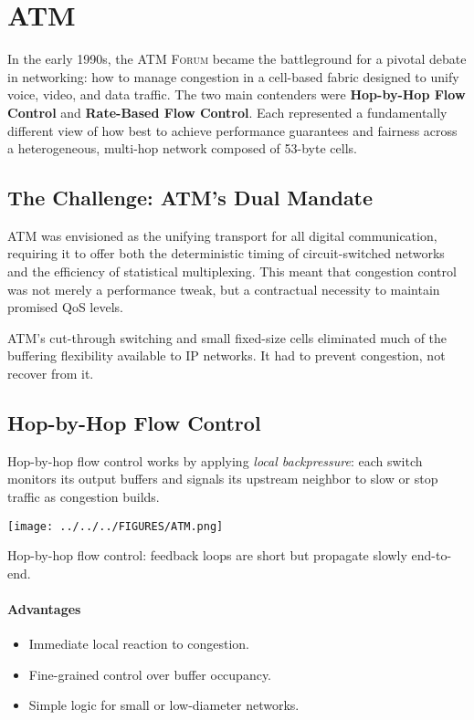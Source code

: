 \section{ATM}

In the early 1990s, the \textsc{ATM Forum} became the battleground for a pivotal debate in networking: how to manage congestion in a cell-based fabric designed to unify voice, video, and data traffic. The two main contenders were \textbf{Hop-by-Hop Flow Control} and \textbf{Rate-Based Flow Control}. Each represented a fundamentally different view of how best to achieve performance guarantees and fairness across a heterogeneous, multi-hop network composed of 53-byte cells.

\subsection{The Challenge: ATM’s Dual Mandate}

ATM was envisioned as the unifying transport for all digital communication, requiring it to offer both the deterministic timing of circuit-switched networks and the efficiency of statistical multiplexing. This meant that congestion control was not merely a performance tweak, but a contractual necessity to maintain promised QoS levels.

ATM’s cut-through switching and small fixed-size cells eliminated much of the buffering flexibility available to IP networks. It had to prevent congestion, not recover from it.

\subsection{Hop-by-Hop Flow Control}

Hop-by-hop flow control works by applying \textit{local backpressure}: each switch monitors its output buffers and signals its upstream neighbor to slow or stop traffic as congestion builds.

\begin{marginfigure}
\texttt{[image: ../../../FIGURES/ATM.png]}
\caption{Hop-by-hop flow control: feedback loops are short but propagate slowly end-to-end.}
\end{marginfigure}

\paragraph{Advantages}
\begin{itemize}
  \item Immediate local reaction to congestion.
  \item Fine-grained control over buffer occupancy.
  \item Simple logic for small or low-diameter networks.
\end{itemize}


